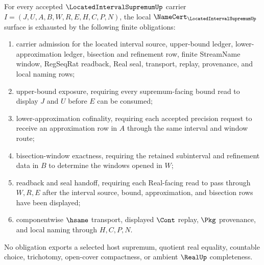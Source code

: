 \begin{theorem}
\label{thm:located-interval-supremum-namecert-obligations}
For every accepted $\LocatedIntervalSupremumUp$ carrier $I=(J,U,A,B,W,R,E,H,C,P,N)$, the local $\NameCert_{\LocatedIntervalSupremumUp}$ surface is exhausted by the following finite obligations:
\begin{enumerate}
\item carrier admission for the located interval source, upper-bound ledger, lower-approximation ledger, bisection and refinement row, finite StreamName window, RegSeqRat readback, Real seal, transport, replay, provenance, and local naming rows;
\item upper-bound exposure, requiring every supremum-facing bound read to display $J$ and $U$ before $E$ can be consumed;
\item lower-approximation cofinality, requiring each accepted precision request to receive an approximation row in $A$ through the same interval and window route;
\item bisection-window exactness, requiring the retained subinterval and refinement data in $B$ to determine the windows opened in $W$;
\item readback and seal handoff, requiring each Real-facing read to pass through $W,R,E$ after the interval source, bound, approximation, and bisection rows have been displayed;
\item componentwise $\hsame$ transport, displayed $\Cont$ replay, $\Pkg$ provenance, and local naming through $H,C,P,N$.
\end{enumerate}
No obligation exports a selected host supremum, quotient real equality, countable choice, trichotomy, open-cover compactness, or ambient $\RealUp$ completeness.
\end{theorem}
